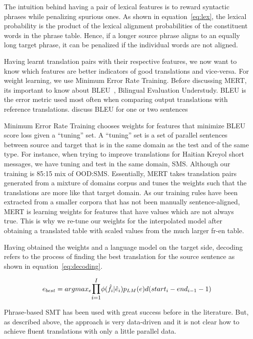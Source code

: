 The intuition behind having a pair of lexical features is to reward syntactic phrases while penalizing spurious ones. As shown in equation~\eqref{eq:lex}, the lexical probability is the product of the lexical alignment probabilities of the constituent words in the phrase table. Hence, if a longer source phrase aligns to an equally long target phrase, it can be penalized if the individual words are not aligned. 

Having learnt translation pairs with their respective features, we now want to know which features are better indicators of good translations and vice-versa. For weight learning, we use Minimum Error Rate Training. Before discussing MERT, its important to know about BLEU~\cite{Papineni:02}, Bilingual Evaluation Understudy. BLEU is the error metric used most often when comparing output translations with reference translations. \alert{discuss BLEU for one or two sentences}

Minimum Error Rate Training chooses weights for features that minimize BLEU score loss given a ``tuning'' set. A ``tuning'' set is a set of parallel sentences between source and target that is in the same domain as the test and of the same type. For instance, when trying to improve translations for Haitian Kreyol short messages, we have tuning and test in the same domain, SMS. Although our training is 85:15 mix of OOD:SMS. Essentially, MERT takes translation pairs generated from a mixture of domains corpus and tunes the weights such that the translations are more like that target domain. As our training rules have been extracted from a smaller corpora that has not been manually sentence-aligned, MERT is learning weights for features that have values which are not always true. This is why we re-tune our weights for the interpolated model after obtaining a translated table with scaled values from the much larger fr-en table. 

Having obtained the weights and a language model on the target side, decoding refers to the process of finding the best translation for the source sentence as shown in equation~\eqref{eq:decoding}. 

\begin{equation} \label{eq:decoding}
	e_{best} = argmax_{e} \mathlarger{\prod\limits_{i=1}^I} \phi(\hat{f}_{i} | \hat{e}_{i})p_{LM}(e)d(start_{i} - end_{i-1}-1)
\end{equation}

Phrase-based SMT has been used with great success before in the literature. But, as described above, the approach is very data-driven and it is not clear how to achieve fluent translations with only a little parallel data. 



